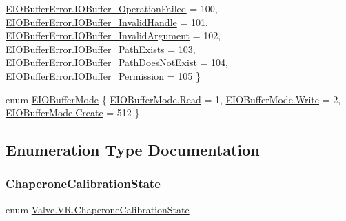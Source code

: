 \begin{DoxyCompactItemize}
$$\mbox{\hyperlink{namespace_valve_1_1_v_r_a11d6c73dbb80923b10779c007bb8c154ad72581afa75989baedfdedab4ace6fae}{E\+I\+O\+Buffer\+Error.\+I\+O\+Buffer\+\_\+\+Operation\+Failed}} = 100, 
\mbox{\hyperlink{namespace_valve_1_1_v_r_a11d6c73dbb80923b10779c007bb8c154ab46e3203787e8dd48931e84bb020901d}{E\+I\+O\+Buffer\+Error.\+I\+O\+Buffer\+\_\+\+Invalid\+Handle}} = 101, 
\mbox{\hyperlink{namespace_valve_1_1_v_r_a11d6c73dbb80923b10779c007bb8c154a906b16638e729461ff7d7cc24c91460c}{E\+I\+O\+Buffer\+Error.\+I\+O\+Buffer\+\_\+\+Invalid\+Argument}} = 102, 
\newline
\mbox{\hyperlink{namespace_valve_1_1_v_r_a11d6c73dbb80923b10779c007bb8c154a1c209e0020103d998f4e640512e7ea12}{E\+I\+O\+Buffer\+Error.\+I\+O\+Buffer\+\_\+\+Path\+Exists}} = 103, 
\mbox{\hyperlink{namespace_valve_1_1_v_r_a11d6c73dbb80923b10779c007bb8c154ad528a1c3bc3a384c26f3d99cff84f4c6}{E\+I\+O\+Buffer\+Error.\+I\+O\+Buffer\+\_\+\+Path\+Does\+Not\+Exist}} = 104, 
\mbox{\hyperlink{namespace_valve_1_1_v_r_a11d6c73dbb80923b10779c007bb8c154af8e8ba3b87098e43ac228f0b5fa33ec9}{E\+I\+O\+Buffer\+Error.\+I\+O\+Buffer\+\_\+\+Permission}} = 105
 \}
\item 
enum \mbox{\hyperlink{namespace_valve_1_1_v_r_a59487dd6eb3684570995a3bea405db2e}{E\+I\+O\+Buffer\+Mode}} \{ \mbox{\hyperlink{namespace_valve_1_1_v_r_a59487dd6eb3684570995a3bea405db2ea7a1a5f3e79fdc91edf2f5ead9d66abb4}{E\+I\+O\+Buffer\+Mode.\+Read}} = 1, 
\mbox{\hyperlink{namespace_valve_1_1_v_r_a59487dd6eb3684570995a3bea405db2ea1129c0e4d43f2d121652a7302712cff6}{E\+I\+O\+Buffer\+Mode.\+Write}} = 2, 
\mbox{\hyperlink{namespace_valve_1_1_v_r_a59487dd6eb3684570995a3bea405db2ea686e697538050e4664636337cc3b834f}{E\+I\+O\+Buffer\+Mode.\+Create}} = 512
 \}
\end{DoxyCompactItemize}


\subsection{Enumeration Type Documentation}
\mbox{\label{namespace_valve_1_1_v_r_ab893e8e2bf198a8cb4d2a2cd9c545c32}} 
\subsubsection{\texorpdfstring{ChaperoneCalibrationState}{ChaperoneCalibrationState}}
{\footnotesize\ttfamily enum \mbox{\hyperlink{namespace_valve_1_1_v_r_ab893e8e2bf198a8cb4d2a2cd9c545c32}{Valve.\+V\+R.\+Chaperone\+Calibration\+State}}\hspace{0.3cm}{\ttfamily [strong]}}

